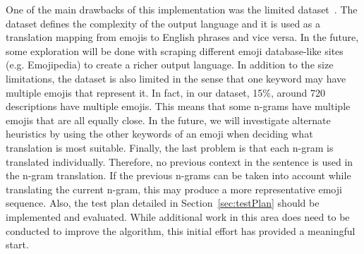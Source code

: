 \documentclass{article}[10]
\begin{document}
One of the main drawbacks of this implementation was the limited
dataset~\cite{Eisner_2016}. The dataset defines the complexity of the output
language and it is used as a translation mapping from emojis to English phrases
and vice versa. In the future, some exploration will be
done with scraping different emoji database-like sites (e.g. Emojipedia) to
create a richer output language. In addition to the size limitations, the
dataset is also limited in the sense that one keyword may have multiple emojis
that represent it. In fact, in our dataset, 15\%, around 720 descriptions have
multiple emojis. This means that some n-grams have multiple emojis that are all
equally close. In the future, we will investigate alternate heuristics by using
the other keywords of an emoji when deciding what translation is most suitable.
Finally, the last problem is that each n-gram is translated individually.
Therefore, no previous context in the sentence is used in the n-gram
translation. If the previous n-grams can be taken into account while translating
the current n-gram, this may produce a more representative emoji sequence. Also,
the test plan detailed in Section~\ref{sec:testPlan} should be implemented and
evaluated. While additional work in this area does need to be conducted to
improve the algorithm, this initial effort has provided a meaningful start.

\makeatother  
\end{document}
